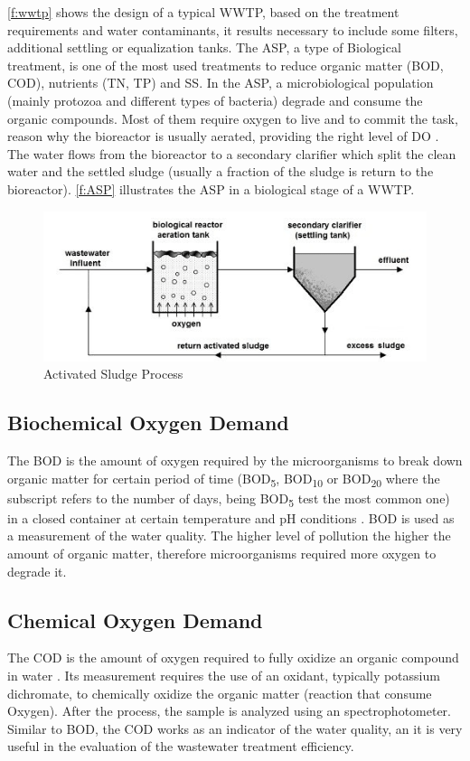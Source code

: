 \autoref{f:wwtp} shows the design of a typical \ac{WWTP}, based on the treatment requirements and water contaminants, it results necessary to include some filters, additional settling or equalization tanks.
The \ac{ASP}, a type of Biological treatment, is one of the most used treatments to reduce organic matter (\ac{BOD}, \ac{COD}), nutrients (\ac{TN}, \ac{TP}) and \ac{SS}. In the \ac{ASP}, a microbiological population (mainly protozoa and different types of bacteria) degrade and consume the organic compounds. Most of them require oxygen to live and to commit the task, reason why the bioreactor is usually aerated, providing the right level of \ac{DO} \cite{Haimi2013}. The water flows from the bioreactor to a secondary clarifier which split the clean water and the settled sludge (usually a fraction of the sludge is return to the bioreactor). \autoref{f:ASP} illustrates the \ac{ASP} in a biological stage of a \ac{WWTP}.

\begin{figure}[h]
\centering
\includegraphics[width=14cm]{figures/Ch2/ASP.png}
\caption{Activated Sludge Process \cite{Fracz2016}}
\label{f:ASP}
\end{figure}

\subsection{Biochemical Oxygen Demand}
The \ac{BOD} is the amount of oxygen required by the microorganisms to break down organic matter for certain period of time (BOD\textsubscript{5}, BOD\textsubscript{10} or BOD\textsubscript{20} where the subscript refers to the number of days, being BOD\textsubscript{5} test the most common one) in a closed container at certain temperature and pH conditions \cite{Wiesmann2007}. \ac{BOD} is used as a measurement of the water quality. The higher level of pollution the higher the amount of organic matter, therefore microorganisms required more oxygen to degrade it.

\subsection{Chemical Oxygen Demand}
The \ac{COD} is the amount of oxygen required to fully oxidize an organic compound in water \cite{Wiesmann2007}. Its measurement requires the use of an oxidant, typically potassium dichromate, to chemically oxidize the organic matter (reaction that consume Oxygen). After the process, the sample is analyzed using an spectrophotometer. Similar to \ac{BOD}, the \ac{COD} works as an indicator of the water quality, an it is very useful in the evaluation of the wastewater treatment efficiency.

